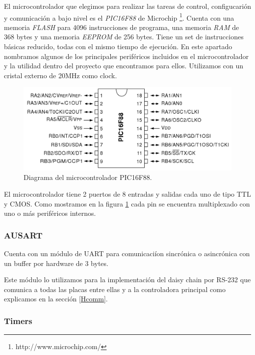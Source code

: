 	El microcontrolador que elegimos para realizar las tareas de control, configucari\'on y comunicaci\'on a bajo nivel es el \emph{PIC16F88} de
	Microchip \footnote{http://www.microchip.com/}. Cuenta con una memoria \emph{FLASH} para 4096 instrucciones de programa, una memoria
	\emph{RAM} de 368 bytes y una memoria \emph{EEPROM} de 256 bytes. Tiene un set de instrucciones b\'asicas reducido, todas con el mismo
	tiempo de ejecuci\'on. En este apartado nombramos algunos de los principales perif\'ericos incluidos en el microcontrolador y la utilidad
	dentro del proyecto que encontramos para ellos. Utilizamos con un cristal externo de 20MHz como clock.
	
	\begin{figure}[ht]
		\centering
		\includegraphics[scale=0.20]{pic16f88.png}
		\caption{Diagrama del microcontrolador PIC16F88.}
		\label{HFpic16f88}
	\end{figure}
	
	El microcontrolador tiene 2 puertos de 8 entradas y salidas cada uno de tipo TTL y CMOS.
	Como mostramos en la figura \ref{HFpic16f88} cada pin se encuentra multiplexado con uno o m\'as perif\'ericos internos.

\subsubsection{AUSART}
\label{HMrs232}

Cuenta con un m\'odulo de UART para comunicaci\'ion sincr\'onica o asincr\'onica con un buffer por hardware de 3 bytes.

Este m\'odulo lo utilizamos para la implementaci\'on del daisy chain por RS-232 que comunica a todas las placas entre
ellas y a la controladora principal como explicamos en la secci\'on \ref{Hcomm}.

\subsubsection{Timers}
\label{timers}

